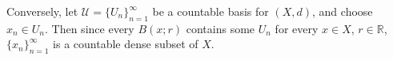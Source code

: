 \documentclass{article}
\begin{document}
\begin{enumerate}
Conversely, let \(\mathcal{U} = \{U_n\}_{n = 1}^{\infty}\) be a countable basis for \((X,d)\), and choose \(x_n \in U_n\).  Then since every \(B(x;r)\) contains some \(U_n\) for every \(x \in X\), \(r \in \mathbb{R}\), \(\{x_n\}_{n = 1}^{\infty}\) is a countable dense subset of \(X\).



\end{enumerate}
\end{document}
